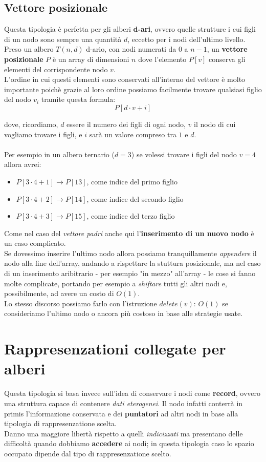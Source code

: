 \documentclass{article}
\begin{document}
\subsection*{Vettore posizionale}
Questa tipologia è perfetta per gli alberi \textbf{d-ari},
ovvero quelle strutture i cui figli di un nodo sono sempre una quantità
$d$, eccetto per i nodi dell'ultimo livello. 
Preso un albero $T(n, d)$ d-ario, con nodi numerati da $0$ a $n - 1$, un 
\textbf{vettore posizionale} $P$ è un array di dimensioni $n$ dove
l'elemento $P[v]$ conserva gli elementi del corrispondente nodo $v$. \\
L'ordine in cui questi elementi sono conservati all'interno del vettore è 
molto importante poichè grazie al loro ordine possiamo facilmente trovare
qualsiasi figlio del nodo $v_i$ tramite questa formula:
\[ P[d \cdot v + i] \]

dove, ricordiamo, $d$ essere il numero dei figli di ogni nodo, $v$ il nodo 
di cui vogliamo trovare i figli, e $i$ sarà un valore compreso tra $1$ e $d$.
\\
\\
Per esempio in un albero ternario ($d = 3$) se volessi trovare i figli del 
nodo $v = 4$ allora avrei:
\begin{itemize}
  \item $P[3 \cdot 4 + 1] \rightarrow P[13]$, come indice del primo figlio 
  \item $P[3 \cdot 4 + 2] \rightarrow P[14]$, come indice del secondo figlio
  \item $P[3 \cdot 4 + 3] \rightarrow P[15]$, come indice del terzo figlio
\end{itemize}
Come nel caso del \textit{vettore padri} anche qui l'\textbf{inserimento di un nuovo nodo}
è un caso complicato.  \\
Se dovessimo inserire l'ultimo nodo allora possiamo tranquillamente 
\textit{appendere} il nodo alla fine dell'array, andando a rispettare la stuttura posizionale,
ma nel caso di un inserimento aribitrario - per esempio "in mezzo" all'array - le cose si fanno
molte complicate, portando per esempio a \textit{shiftare} tutti gli altri nodi e, possibilmente,
ad avere un costo di $O(1)$. \\
Lo stesso discorso possiamo farlo con l'istruzione $delete(v)$: $O(1)$ se consideriamo 
l'ultimo nodo o ancora più costoso in base alle strategie usate.

\section*{Rappresenzationi collegate per alberi}
Questa tipologia si basa invece sull'idea di conservare i nodi come \textbf{record}, ovvero
una struttura capace di contenere \textit{dati eterogenei}. Il nodo infatti conterrà in primis
l'informazione conservata e dei \textbf{puntatori} ad altri nodi in base alla tipologia
di rappresenzatione scelta. \\
Danno una maggiore libertà rispetto a quelli \textit{indicizzati} ma presentano delle difficoltà
quando dobbiamo \textbf{accedere} ai nodi; in questa tipologia caso lo spazio occupato 
dipende dal tipo di rappresenzatione scelto.
\end{document}
